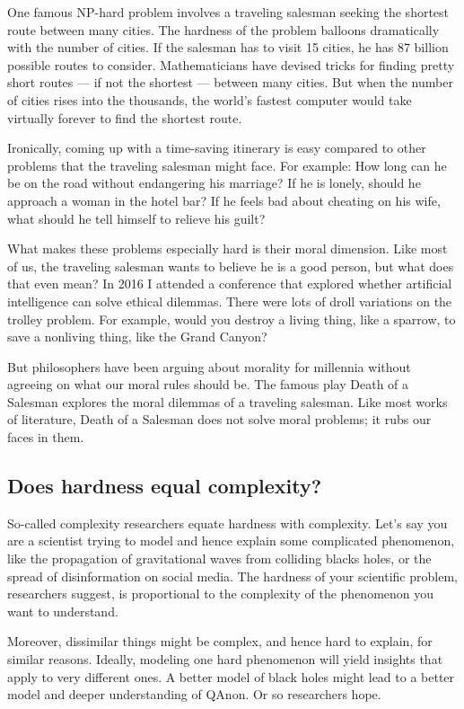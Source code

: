 \documentclass[a4paper]{article}
\begin{document}
One famous NP-hard problem involves a traveling salesman seeking the shortest route between many cities. The hardness of the problem balloons dramatically with the number of cities. If the salesman has to visit 15 cities, he has 87 billion possible routes to consider. Mathematicians have devised tricks for finding pretty short routes --- if not the shortest --- between many cities. But when the number of cities rises into the thousands, the world’s fastest computer would take virtually forever to find the shortest route.

Ironically, coming up with a time-saving itinerary is easy compared to other problems that the traveling salesman might face. For example: How long can he be on the road without endangering his marriage? If he is lonely, should he approach a woman in the hotel bar? If he feels bad about cheating on his wife, what should he tell himself to relieve his guilt?

What makes these problems especially hard is their moral dimension. Like most of us, the traveling salesman wants to believe he is a good person, but what does that even mean? In 2016 I attended a conference that explored whether artificial intelligence can solve ethical dilemmas. There were lots of droll variations on the trolley problem. For example, would you destroy a living thing, like a sparrow, to save a nonliving thing, like the Grand Canyon?

But philosophers have been arguing about morality for millennia without agreeing on what our moral rules should be. The famous play Death of a Salesman explores the moral dilemmas of a traveling salesman. Like most works of literature, Death of a Salesman does not solve moral problems; it rubs our faces in them.
\subsection*{Does hardness equal complexity?}
So-called complexity researchers equate hardness with complexity. Let’s say you are a scientist trying to model and hence explain some complicated phenomenon, like the propagation of gravitational waves from colliding blacks holes, or the spread of disinformation on social media. The hardness of your scientific problem, researchers suggest, is proportional to the complexity of the phenomenon you want to understand.

Moreover, dissimilar things might be complex, and hence hard to explain, for similar reasons. Ideally, modeling one hard phenomenon will yield insights that apply to very different ones. A better model of black holes might lead to a better model and deeper understanding of QAnon. Or so researchers hope.
\end{document}
